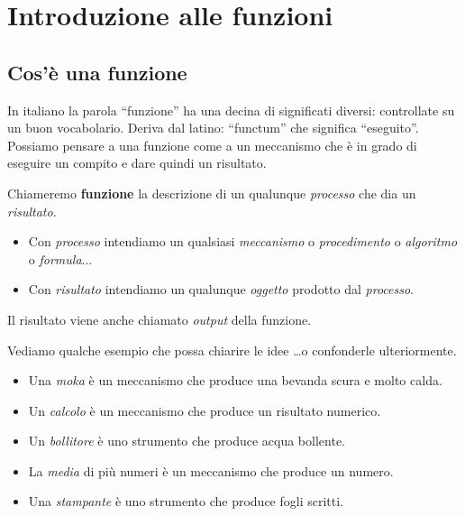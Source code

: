 


\chapter{Introduzione alle funzioni}

\section{Cos'è una funzione}
\label{sec:funzioni2_cose}

In italiano la parola  ``funzione'' ha una decina di significati diversi: 
controllate su un buon vocabolario. Deriva dal latino:  ``functum'' che 
significa  ``eseguito''.
Possiamo pensare a una funzione come a un meccanismo che è in grado di 
eseguire un compito e dare quindi un risultato.

\begin{definizione}
 Chiameremo \textbf{funzione} la descrizione di un qualunque 
 \emph{processo} che dia un \emph{risultato}.
\end{definizione}

\begin{itemize} [noitemsep]
 \item Con \emph{processo} intendiamo un qualsiasi \emph{meccanismo} o 
\emph{procedimento} o \emph{algoritmo} o \emph{formula}...
 \item Con \emph{risultato} intendiamo un qualunque \emph{oggetto} prodotto 
dal \emph{processo}.
\end{itemize}

Il risultato viene anche chiamato \emph{output} della funzione.
 
\begin{esempio}
Vediamo qualche esempio che possa chiarire le idee \dots o confonderle 
ulteriormente.
\begin{itemize} [noitemsep]
 \item Una \emph{moka} è un meccanismo che produce una bevanda scura e 
molto calda.
 \item Un \emph{calcolo} è un meccanismo che produce un risultato numerico.
 \item Un \emph{bollitore} è uno strumento che produce acqua bollente.
 \item La \emph{media}  di più numeri è un meccanismo che produce un numero.
 \item Una \emph{stampante} è uno strumento che produce fogli scritti.
\end{itemize}
\end{esempio}

